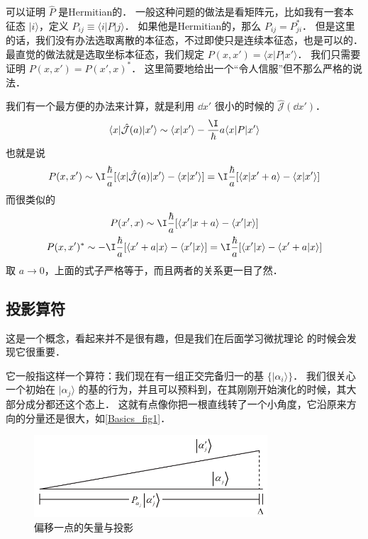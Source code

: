 \begin{exam}{}
可以证明 $\hat{P}$ 是Hermitian的． 一般这种问题的做法是看矩阵元，比如我有一套本征态 $|i\rangle$，定义 $P_{ij} \equiv \langle i|P|j\rangle$． 如果他是Hermitian的，那么 $P_{ij} = P_{ji}^*$． 但是这里的话，我们没有办法选取离散的本征态，不过即使只是连续本征态，也是可以的． 最直觉的做法就是选取坐标本征态，我们规定 $P(x,x') = \langle x|P|x'\rangle$． 我们只需要证明 $P(x,x') = P(x',x)^*$． 这里简要地给出一个“令人信服”但不那么严格的说法．

我们有一个最方便的办法来计算，就是利用 $\dd{x'}$ 很小的时候的 $\hat{\mathcal{J}}(\dd{x'})$．
\begin{equation}
\langle x|\hat{\mathcal{J}}(a)|x'\rangle \sim \langle x|x'\rangle - \frac{\I}{\hbar} a \langle x|P|x'\rangle
\end{equation}
也就是说
\begin{equation}
P(x,x') \sim \I\frac{\hbar}{a}[\langle x|\hat{\mathcal{J}}(a)|x'\rangle - \langle x|x'\rangle] = \I\frac{\hbar}{a}[\langle x|x'+a\rangle - \langle x|x'\rangle]
\end{equation}
而很类似的
\begin{gather}
P(x',x) \sim \I\frac{\hbar}{a}[\langle x'|x+a\rangle - \langle x'|x\rangle]\\
P(x,x')^* \sim -\I\frac{\hbar}{a} [\langle x'+a|x\rangle - \langle x'|x\rangle] = \I\frac{\hbar}{a} [\langle x'|x\rangle - \langle x'+a|x\rangle]
\end{gather}
取 $a\rightarrow0$，上面的式子严格等于，而且两者的关系更一目了然．
\end{exam}

\subsection{投影算符}

这是一个概念，看起来并不是很有趣，但是我们在后面学习微扰理论%
的时候会发现它很重要．

它一般指这样一个算符：我们现在有一组正交完备归一的基 $\{|\alpha_i\rangle\}$． 我们很关心一个初始在 $|\alpha_j\rangle$ 的基的行为，并且可以预料到，在其刚刚开始演化的时候，其大部分成分都还这个态上． 这就有点像你把一根直线转了一个小角度，它沿原来方向的分量还是很大，如\autoref{Basics_fig1}．

\begin{figure}[ht]
\centering
\includegraphics[width=8.7cm]{./figures/Basics1.pdf}
\caption{偏移一点的矢量与投影} \label{Basics_fig1}
\end{figure}

